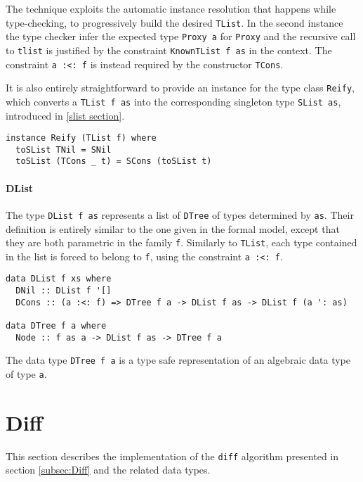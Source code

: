 \documentclass[../Thesis.tex]{subfiles}
\begin{document}
	The technique exploits the automatic instance resolution that happens
	while type-checking, to progressively build the desired \texttt{TList}.
	In the second instance the type checker infer the expected type 
	\texttt{Proxy a} for \texttt{Proxy} and the recursive call to \texttt{tlist} is 
	justified by the constraint  \texttt{KnownTList f as} in the context. 
	The constraint \texttt{a :<: f} is 	instead required by	the constructor 
	\texttt{TCons}.
		
	It is also entirely straightforward to provide an instance for the 
	type	class \texttt{Reify}, which converts a \texttt{TList f as} 
	into the corresponding singleton type 
	\texttt{SList as}, introduced in \ref{slist section}. 

\begin{verbatim}
instance Reify (TList f) where
  toSList TNil = SNil
  toSList (TCons _ t) = SCons (toSList t)
\end{verbatim}
	
	\paragraph{DList}
	The type \texttt{DList f as} represents a list of \texttt{DTree} of types
	determined by 	\texttt{as}. Their definition is entirely similar to
	the one given in the formal model, except that they are both parametric
	in the family \texttt{f}. Similarly to \texttt{TList}, each type contained
	in the list is forced to belong to \texttt{f}, using the constraint 
	\texttt{a :<: f}.
	
\begin{verbatim}
data DList f xs where
  DNil :: DList f '[]
  DCons :: (a :<: f) => DTree f a -> DList f as -> DList f (a ': as)

data DTree f a where
  Node :: f as a -> DList f as -> DTree f a
\end{verbatim}
	
	The data type \texttt{DTree f a} is a type safe representation of
	an algebraic data type of type \texttt{a}.
	
	\section{Diff}
	This section describes the implementation of the 
	\texttt{diff} algorithm presented in 	section \ref{subsec:Diff} 
	and the related data types. 
	
\end{document}
